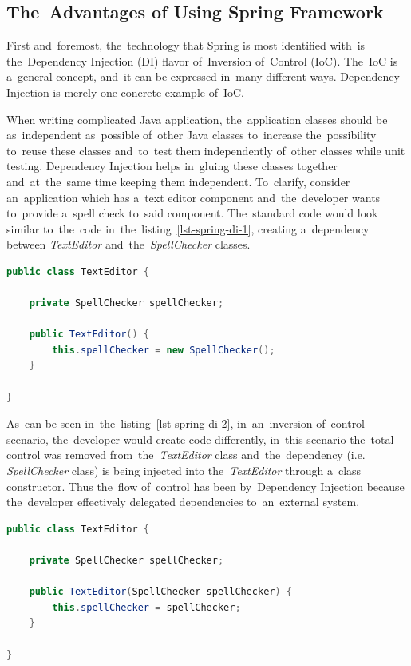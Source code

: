\subsection{The~Advantages of Using Spring Framework}
First and~foremost, the~technology that Spring is most identified with~is
the~Dependency Injection (DI) flavor of~Inversion of~Control (IoC). The~IoC is
a~general concept, and~it can be expressed in~many different ways. Dependency
Injection is merely one concrete example of~IoC.

When writing complicated Java application, the~application classes should be
as~independent as~possible of~other Java classes to~increase the~possibility
to~reuse these classes and~to~test them independently of~other classes while
unit testing. Dependency Injection helps in~gluing these classes together
and~at~the~same time keeping them independent. To~clarify, consider
an~application which has a~text editor component and~the~developer wants
to~provide a~spell check to~said component. The~standard code would look similar
to~the~code in~the~listing~\ref{lst-spring-di-1}, creating a~dependency between
\textit{TextEditor} and~the~\textit{SpellChecker} classes.

\vspace{1mm}
\begin{lstlisting}[caption=The~standard way of~providing spell checking
to~a~component., style=dp-default, language=Java, label=lst-spring-di-1] 
public class TextEditor {

	private SpellChecker spellChecker;
	
	public TextEditor() {
		this.spellChecker = new SpellChecker();
	}
	
}
\end{lstlisting}

As~can be seen in~the~listing~\ref{lst-spring-di-2}, in~an~inversion of~control
scenario, the~developer would create code differently, in~this scenario
the~total control was removed from~the~\textit{TextEditor} class
and~the~dependency (i.e. \textit{SpellChecker} class) is being injected into
the~\textit{TextEditor} through a~class constructor. Thus the~flow of~control
has been  by~Dependency Injection because the~developer effectively
delegated dependencies to~an~external system.

\pagebreak
\begin{lstlisting}[caption=The~Inversion of~Control scenario of~providing
a~\textit{SpellChecker} to~the~\textit{TextEditor} component., style=dp-default,
language=Java, label=lst-spring-di-2]
public class TextEditor {

	private SpellChecker spellChecker;
	
	public TextEditor(SpellChecker spellChecker) {
		this.spellChecker = spellChecker;
	}
	
}
\end{lstlisting}

